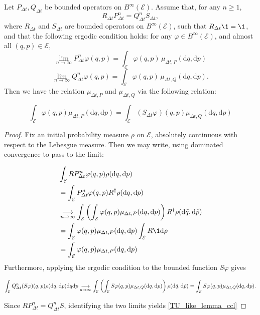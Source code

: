 \begin{lemma}
  \label{TU_like_lemma}
  Let $P_{\Delta t}, Q_{\Delta t}$ be bounded operators on $B^\infty(\mathcal E)$.
    Assume that, for any $n\geq 1$,
    $$ R_{\Delta t} P_{\Delta t}^n = Q_{\Delta t}^n S_{\Delta t},$$
    where $R_{\Delta t}$ and $S_{\Delta t}$ are bounded operators on $B^\infty (\mathcal E)$, such that $R_{\Delta t}\1=\1$, and that the following ergodic condition holds: for any $\varphi \in B^\infty(\mathcal E)$, and almost all $(q,p) \in \mathcal E$,
    $$ \underset{n\to\infty}\lim P_{\Delta t}^n\varphi (q,p) = \int_{\mathcal E} \varphi(q,p)\,\mu_{\Delta t,P}(\mathrm{d} q,\mathrm{d} p) $$
    $$ \underset{n\to\infty}\lim Q_{\Delta t}^n\varphi (q,p) = \int_{\mathcal E} \varphi(q,p)\,\mu_{\Delta t,Q}(\mathrm{d} q,\mathrm{d} p).$$
    Then  we have the relation $\mu_{\Delta t,P}$ and $\mu_{\Delta t,Q}$ via the following relation:

    \begin{equation*}
      \label{TU_like_lemma_ccl}
    \int_{\mathcal E} \varphi(q,p) \mu_{\Delta t,P}(\mathrm{d} q,\mathrm{d} p)=\int_{\mathcal E} \left(S_{\Delta t}\varphi\right)(q,p) \mu_{\Delta t,Q}(\mathrm{d} q,\mathrm{d} p)
    \end{equation*}
\end{lemma}
\begin{proof}
  Fix an initial probability measure $\rho$ on $\mathcal E$, absolutely continuous with respect to the Lebesgue measure. Then we may write, using dominated convergence to pass to the limit:

  \begin{align*}
      &\int_{\mathcal E}RP_{\Delta t}^n \varphi(q,p)\rho(\text d q,\text d p)\\
      &=\int_{\mathcal E}P_{\Delta t}^n \varphi(q,p)R^{\dagger}\rho(\text d q,\text d p)\\
      &\underset{n\to\infty}{\longrightarrow}\int_{\mathcal E} \left(\int_{\mathcal E}\varphi(q,p)\mu_{\Delta t,P}(\text d q,\text d p)\right) R^\dagger \rho(\text d \tilde q,\text d \tilde p)\\
      &=\int_{\mathcal E}\varphi(q,p)\mu_{\Delta t,P}(\text d q,\text d p)\int_{\mathcal E}R\1 \text d \rho\\
      &=\int_{\mathcal E}\varphi(q,p)\mu_{\Delta t,P}(\text d q,\text d p)
  \end{align*}
  Furthermore, applying the ergodic condition to the bounded function $S\varphi$ gives

  $$ \int_{\mathcal E} Q_{\Delta t}^n (S\varphi)(q,p) \rho(\text d q,\text d p) \text d q \text d p \underset{n\to\infty}{\longrightarrow}\int_{\mathcal E} \left (\int_{\mathcal E}S\varphi(q,p)\mu_{\Delta t,Q}(\text d q,\text d p)\right)\rho(\text d \tilde q,\text d \tilde p)=\int_{\mathcal E}S\varphi(q,p)\mu_{\Delta t,Q}(\text d q,\text d p).$$

  Since $RP_{\Delta t}^n=Q_{\Delta t}^n S$, identifying the two limits yields \eqref{TU_like_lemma_ccl}
\end{proof}


